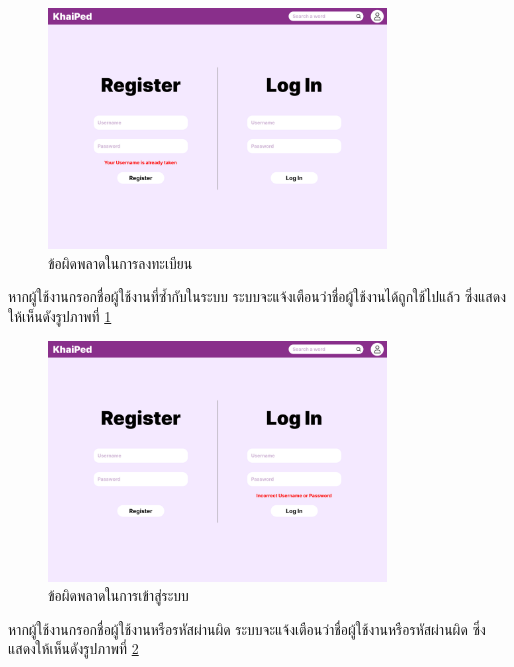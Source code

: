 \documentclass[12pt,oneside,openright,a4paper]{cpe-thai-project}
\begin{document}
\pagebreak
\begin{figure}[!h]\centering
	\includegraphics[width=0.8\textwidth, keepaspectratio=true]{image/chap3/ui/login/Home page - Register error.png}
	\caption{ข้อผิดพลาดในการลงทะเบียน}\label{fig:UI_RegisterError}
\end{figure}
\hspace{1cm}
หากผู้ใช้งานกรอกชื่อผู้ใช้งานที่ซ้ำกับในระบบ ระบบจะแจ้งเตือนว่าชื่อผู้ใช้งานได้ถูกใช้ไปแล้ว ซึ่งแสดงให้เห็นดังรูปภาพที่ \ref{fig:UI_RegisterError}

\begin{figure}[!h]\centering
	\includegraphics[width=0.8\textwidth, keepaspectratio=true]{image/chap3/ui/login/Home page - Log in error.png}
	\caption{ข้อผิดพลาดในการเข้าสู่ระบบ}\label{fig:UI_LogInError}
\end{figure}
\hspace{1cm}
หากผู้ใช้งานกรอกชื่อผู้ใช้งานหรือรหัสผ่านผิด ระบบจะแจ้งเตือนว่าชื่อผู้ใช้งานหรือรหัสผ่านผิด ซึ่งแสดงให้เห็นดังรูปภาพที่ \ref{fig:UI_LogInError}
\end{document}
